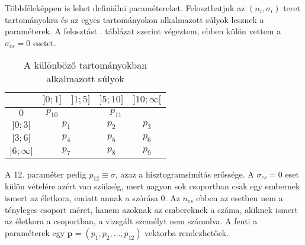 \documentclass[12pt]{article}
\begin{document}
Többféleképpen is lehet definiálni paramétereket. Feloszthatjuk az $(n_i, \sigma_i)$ teret \iffalse TODO: vagy mit \fi tartományokra és az egyes tartományokon alkalmazott súlyok lesznek a paraméterek. A felosztást . táblázat szerint végeztem, ebben külön vettem a $\sigma_{cs} = 0$ esetet. %
\begin{table}[H]
	\centering
	\begin{tabular}{|c|c|c|c|c|}
		\hline
		\diagbox{$\sigma_{cs}$}{$n_{cs}$} & $]0;1]$ & $]1;5]$ & $]5;10]$ & $]10;\infty[$  \\
		\hline
		$0$ & $p_{10}$ & \multicolumn{3}{|c|}{$p_{11}$} \\
		\hline
		$]0;3]$ & \multicolumn{2}{|c|}{$p_1$} & $p_2$ & $p_3$ \\
		\hline
		$]3;6]$ & \multicolumn{2}{|c|}{$p_4$} & $p_5$ & $p_6$ \\
		\hline
		$]6;\infty[$  & \multicolumn{2}{|c|}{$p_7$} & $p_8$ & $p_9$ \\
		\hline
	\end{tabular}
	\caption{A különböző tartományokban alkalmazott súlyok}
	\label{felosztas}
\end{table}
\noindent
A 12. paraméter pedig $p_{12} \equiv \sigma$, azaz a hisztogramsimítás erőssége. A $\sigma_{cs} = 0$ eset külön vételére azért van szükség, mert nagyon sok csoportban csak egy embernek ismert az életkora, emiatt annak a szórása $0$. Az $n_{cs}$ ebben az esetben nem a tényleges csoport méret, hanem azoknak az embereknek a száma, akiknek ismert az életkora a csoportban, a vizsgált személyt nem számolva.
A fenti a paraméterek egy $\mathbf{p} = (p_1, p_2, ..., p_{12})$ vektorba rendezhetőek.
\end{document}

